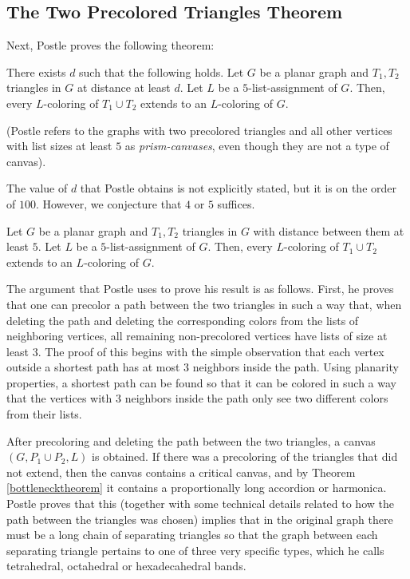 \subsection{The Two Precolored Triangles Theorem}

Next, Postle proves the following theorem:

\begin{theorem}
	\label{twoprecoloredtrianglestheorem}
	There exists $d$ such that the following holds.
	Let $G$ be a planar graph and $T_1, T_2$ triangles in $G$ at distance at least $d$. Let $L$ be a $5$-list-assignment of $G$. Then, every $L$-coloring of $T_1 \cup T_2$ extends to an $L$-coloring of $G$.
\end{theorem}

(Postle refers to the graphs with two precolored triangles and all other vertices with list sizes
at least $5$ as \emph{prism-canvases}, even though they are not a type of canvas).

The value of $d$ that Postle obtains is not explicitly stated, but it is on the order of $100$. However, we conjecture that $4$ or $5$ suffices.

\begin{conjecture}
\label{twotriangleconjecture}
Let $G$ be a planar graph and $T_1, T_2$ triangles in $G$ with distance 
between them at least $5$. Let $L$ be a $5$-list-assignment of $G$. Then, every $L$-coloring of $T_1 \cup T_2$ extends to an $L$-coloring of $G$.
\end{conjecture}

The argument that Postle uses to prove his result is as follows. First, he proves that one can precolor a path between the two triangles in such a way that, when deleting the path and deleting the corresponding colors from the lists of neighboring vertices, all remaining non-precolored vertices have lists of size at least $3$. The proof of this begins with the simple observation that each vertex outside a shortest path has at most $3$ neighbors inside the path. Using planarity properties, a shortest path can be found so that it can be colored in such a way that the vertices with $3$ neighbors inside the path only see two different colors from their lists.

After precoloring and deleting the path between the two triangles, a canvas $(G, P_1 \cup P_2, L)$ is obtained. If there was a precoloring of the triangles that did not extend, then the canvas contains a critical canvas, and by Theorem \ref{bottlenecktheorem} it contains a proportionally long accordion or harmonica. Postle proves that this (together with some technical details related to how the path between the triangles was chosen) implies that in the original graph there must be a long chain of separating triangles so that the graph between each separating triangle pertains to one of three very specific types, which he calls tetrahedral, octahedral or hexadecahedral bands. 

